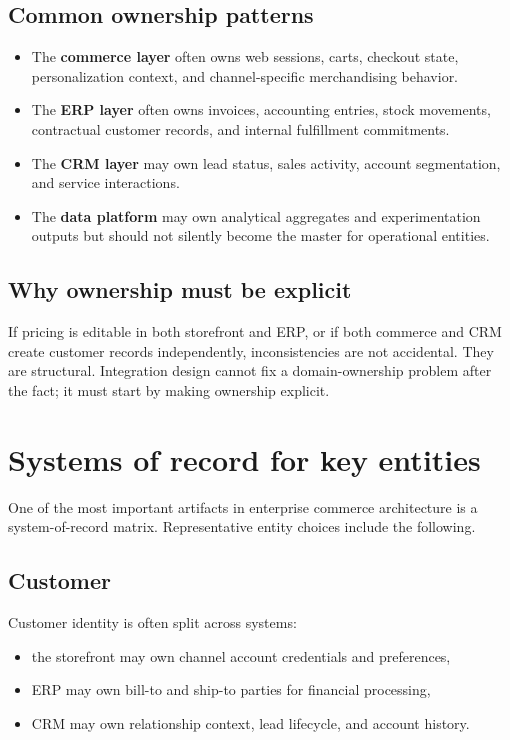 \subsection{Common ownership patterns}
\begin{itemize}
  \item The \textbf{commerce layer} often owns web sessions, carts, checkout state, personalization context, and channel-specific merchandising behavior.
  \item The \textbf{ERP layer} often owns invoices, accounting entries, stock movements, contractual customer records, and internal fulfillment commitments.
  \item The \textbf{CRM layer} may own lead status, sales activity, account segmentation, and service interactions.
  \item The \textbf{data platform} may own analytical aggregates and experimentation outputs but should not silently become the master for operational entities.
\end{itemize}

\subsection{Why ownership must be explicit}
If pricing is editable in both storefront and ERP, or if both commerce and CRM create customer records independently, inconsistencies are not accidental.
They are structural.
Integration design cannot fix a domain-ownership problem after the fact; it must start by making ownership explicit.

\section{Systems of record for key entities}
One of the most important artifacts in enterprise commerce architecture is a system-of-record matrix.
Representative entity choices include the following.

\subsection{Customer}
Customer identity is often split across systems:
\begin{itemize}
  \item the storefront may own channel account credentials and preferences,
  \item ERP may own bill-to and ship-to parties for financial processing,
  \item CRM may own relationship context, lead lifecycle, and account history.
\end{itemize}

